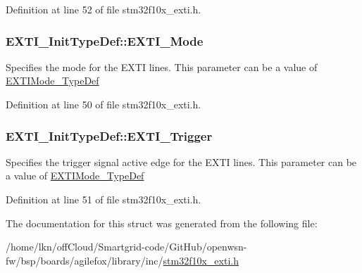 Definition at line 52 of file stm32f10x\+\_\+exti.\+h.

\subsubsection[{\texorpdfstring{E\+X\+T\+I\+\_\+\+Mode}{EXTI_Mode}}]{ E\+X\+T\+I\+\_\+\+Init\+Type\+Def\+::\+E\+X\+T\+I\+\_\+\+Mode}\hypertarget{struct_e_x_t_i___init_type_def_a741816862b9cd43cc80781dc89150e7e}{}\label{struct_e_x_t_i___init_type_def_a741816862b9cd43cc80781dc89150e7e}
Specifies the mode for the E\+X\+TI lines. This parameter can be a value of \hyperlink{openmotestm_2library_2inc_2stm32f10x__exti_8h_ad5e69af98dc0dfdf64417adc1cf57929}{E\+X\+T\+I\+Mode\+\_\+\+Type\+Def} 

Definition at line 50 of file stm32f10x\+\_\+exti.\+h.

\subsubsection[{\texorpdfstring{E\+X\+T\+I\+\_\+\+Trigger}{EXTI_Trigger}}]{ E\+X\+T\+I\+\_\+\+Init\+Type\+Def\+::\+E\+X\+T\+I\+\_\+\+Trigger}\hypertarget{struct_e_x_t_i___init_type_def_ab0bd8417e78fe2b43eed79e44064510c}{}\label{struct_e_x_t_i___init_type_def_ab0bd8417e78fe2b43eed79e44064510c}
Specifies the trigger signal active edge for the E\+X\+TI lines. This parameter can be a value of \hyperlink{openmotestm_2library_2inc_2stm32f10x__exti_8h_ad5e69af98dc0dfdf64417adc1cf57929}{E\+X\+T\+I\+Mode\+\_\+\+Type\+Def} 

Definition at line 51 of file stm32f10x\+\_\+exti.\+h.



The documentation for this struct was generated from the following file\+:\begin{DoxyCompactItemize}
\item 
/home/lkn/off\+Cloud/\+Smartgrid-\/code/\+Git\+Hub/openwsn-\/fw/bsp/boards/agilefox/library/inc/\hyperlink{agilefox_2library_2inc_2stm32f10x__exti_8h}{stm32f10x\+\_\+exti.\+h}\end{DoxyCompactItemize}
